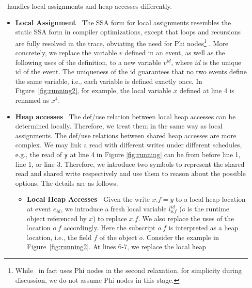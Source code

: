 \tool\ handles local assignments and heap accesses differently.
\begin{itemize}
\item {\bf Local Assignment\ } The SSA form for local assignments 
resembles the static SSA form in compiler optimizations, 
except that loops and recursions are fully resolved in the trace, 
obviating the need for {\sf Phi} nodes\footnote{While \tool\  in fact uses
Phi nodes in the second relaxation, for simplicity during discussion, we 
do not assume Phi nodes in this stage.} . More concretely, we replace the 
variable $v$ defined in an event, as well as the following uses of the 
definition, to a new variable $v^{id}$, where $id$ is the unique id 
of the event. The uniqueness of the id guarantees that no two events 
define the same variable, i.e., each variable is defined exactly once.  
In Figure~\ref{fig:running2}, for example,
the local variable $x$ defined at line 4 is renamed as $x^4$.
\item {\bf Heap accesses\ } The def/use relation between local heap accesses 
can be determined locally. Therefore, we treat them in the same way as 
local assignments. The def/use relations between shared heap accesses 
are more complex. We may link a read with different writes under different 
schedules, e.g., the read of {\tt y} at line 4 in Figure \ref{fig:running} can 
be from before line 1, line 1, or line 3. Therefore, we introduce two symbols to represent the shared read and shared write respectively and use them 
to reason about the possible options.
The details are as follows. 
\begin{itemize}
\item {\bf Local Heap Accesses\ } Given the write $x.f=y$ to a local heap 
location at event $e_{id}$,  we introduce a fresh local variable 
{\tt $l^{id}_{o.f}$} ($o$ is the runtime object referenced by $x$) to 
replace $x.f$. We also replace the uses of the location $o.f$ accordingly.
Here  the subscript $o.f$ is interpreted as a heap location, i.e., the 
field $f$ of the object $o$. Consider the example in 
Figure~\ref{fig:running2}. At lines 6-7, we replace the local heap 

\end{itemize}
\end{itemize}
